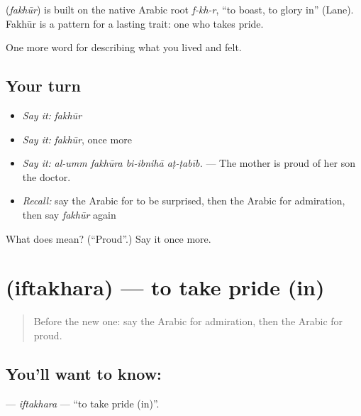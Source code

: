 \begin{cousinweb}
\textbf{} (\emph{fakhūr}) is built on the native Arabic root \emph{f-kh-r}, \textquotedblleft{}to boast, to glory in\textquotedblright{} (Lane). Fakhūr is a pattern for a lasting trait: one who takes pride.
\end{cousinweb}

\begin{grammarlens}[title={What you've built}]
One more word for describing what you lived and felt.
\end{grammarlens}

\subsection*{Your turn}
\begin{itemize}
\raggedright
  \item \emph{Say it:} \emph{fakhūr}
  \item \emph{Say it:} \emph{fakhūr}, once more
  \item \emph{Say it:} \emph{al-umm fakhūra bi-ibnihā aṭ-ṭabīb.} — The mother is proud of her son the doctor.
  \item \emph{Recall:} say the Arabic for to be surprised, then the Arabic for admiration, then say \emph{fakhūr} again
\end{itemize}

\begin{tcolorbox}[breakable,colback=teal!4,colframe=teal!35!black,title={Before you move on}]
What does  mean? (\textquotedblleft{}Proud\textquotedblright{}.) Say it once more.
\end{tcolorbox}
\section[\texorpdfstring{\ar{افتخر} (iftakhara)}{افتخر (iftakhara)}]{ (iftakhara) — to take pride (in)}

\label{lesson:AR-C491-iftakhara}



\begin{quote}
Before the new one: say the Arabic for admiration, then the Arabic for proud.
\end{quote}

\subsection*{You'll want to know: }
\textbf{} — \emph{iftakhara} — \textquotedblleft{}to take pride (in)\textquotedblright{}.


